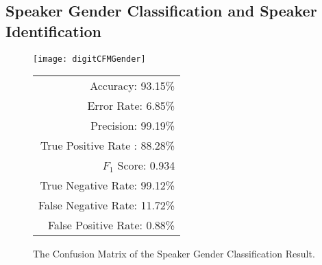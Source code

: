 \subsection{Speaker Gender Classification and Speaker Identification}


\begin{figure}[!h]
	\begin{minipage}{\linewidth}
			\centering
		\begin{minipage}[c]{0.35\linewidth}
			
			\texttt{[image: digitCFMGender]}
		\end{minipage}
		\begin{minipage}[b]{0.49\linewidth}
			 \centering
				\begin{tabular}{r}
				\toprule
				Accuracy: 93.15\% \\ Error Rate: 6.85\% \\
				Precision: 99.19\% \\True Positive Rate : 88.28\% \\
				$F_1$ Score: 0.934 \\ True Negative Rate: 99.12\% \\
				False Negative Rate: 11.72\% \\ False Positive Rate: 0.88\% \\
				\bottomrule
			\end{tabular}
		\end{minipage}
	\end{minipage}
\caption{The Confusion Matrix of the Speaker Gender Classification Result. 
		}
	\label{fig:genderCFM}
\end{figure}


